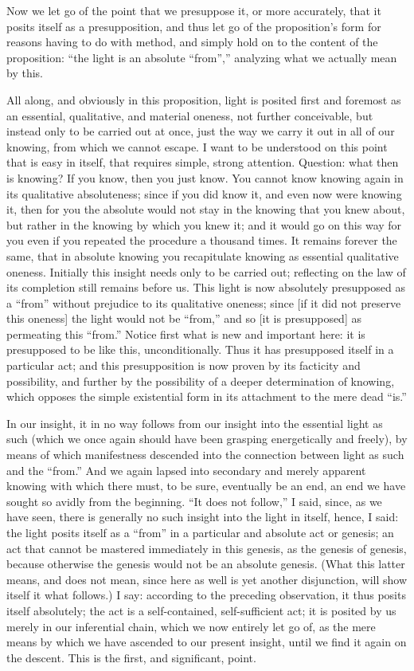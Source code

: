 Now we let go of the point that we presuppose it,
or more accurately, that it posits itself as a presupposition,
and thus let go of the proposition's form
for reasons having to do with method,
and simply hold on to the content of the proposition:
“the light is an absolute “from”,”
analyzing what we actually mean by this.

All along, and obviously in this proposition,
light is posited first and foremost as
an essential, qualitative, and material oneness,
not further conceivable, but instead only to be carried out at once,
just the way we carry it out in all of our knowing,
from which we cannot escape.
I want to be understood on this point that is easy in itself,
that requires simple, strong attention.
Question:
what then is knowing? If you know, then you just know.
You cannot know knowing again in its qualitative absoluteness;
since if you did know it, and even now were knowing it,
then for you the absolute would not stay in
the knowing that you knew about,
but rather in the knowing by which you knew it;
and it would go on this way for you
even if you repeated the procedure a thousand times.
It remains forever the same, that in absolute knowing you
recapitulate knowing as essential qualitative oneness.
Initially this insight needs only to be carried out;
reflecting on the law of its completion still remains before us.
This light is now absolutely presupposed as a “from”
without prejudice to its qualitative oneness;
since [if it did not preserve this oneness] the light would
not be “from,” and so [it is presupposed] as permeating this “from.”
Notice first what is new and important here:
it is presupposed to be like this, unconditionally.
Thus it has presupposed itself in a particular act;
and this presupposition is now proven by its facticity and possibility,
and further by the possibility of a deeper determination of knowing,
which opposes the simple existential form
in its attachment to the mere dead “is.”

In our insight, it in no way follows from our insight
into the essential light as such
(which we once again should have been grasping
energetically and freely),
by means of which manifestness descended into the connection
between light as such and the “from.”
And we again lapsed into secondary and merely apparent knowing
with which there must, to be sure, eventually be an end,
an end we have sought so avidly from the beginning.
“It does not follow,”
I said, since, as we have seen, there is generally
no such insight into the light in itself,
hence, I said: the light posits itself
as a “from” in a particular and absolute act or genesis;
an act that cannot be mastered immediately in this genesis,
as the genesis of genesis,
because otherwise the genesis would
not be an absolute genesis.
(What this latter means, and does not mean,
since here as well is yet another disjunction,
will show itself it what follows.)
I say: according to the preceding observation,
it thus posits itself absolutely;
the act is a self-contained, self-sufficient act;
it is posited by us merely in our inferential chain,
which we now entirely let go of,
as the mere means by which we have
ascended to our present insight,
until we find it again on the descent.
This is the first, and significant, point.


